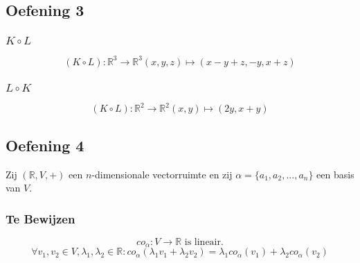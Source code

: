 \documentclass[lineaire_algebra_oplossingen.tex]{subfiles}
\begin{document}
\subsection{Oefening 3}
\subsubsection*{$K\circ L$}
\[
(K\circ L): \mathbb{R}^3\rightarrow\mathbb{R}^3 (x,y,z)\mapsto (x-y+z,-y,x+z)
\]
\subsubsection*{$L\circ K$}
\[
(K\circ L): \mathbb{R}^2\rightarrow\mathbb{R}^2 (x,y)\mapsto (2y,x+y)
\]

\subsection{Oefening 4}
Zij $(\mathbb{R},V,+)$ een $n$-dimensionale vectorruimte en zij $\alpha = \{a_1,a_2,...,a_n\}$ een basis van $V$.
\subsubsection*{Te Bewijzen}
\[co_\alpha:V\rightarrow \mathbb{R} \text{ is lineair.}\]
\[
\forall v_1,v_2 \in V, \lambda_1,\lambda_2\in \mathbb{R}: co_\alpha(\lambda_1v_1+\lambda_2v_2)=\lambda_1co_\alpha(v_1)+\lambda_2co_\alpha(v_2)
\]
\end{document}
